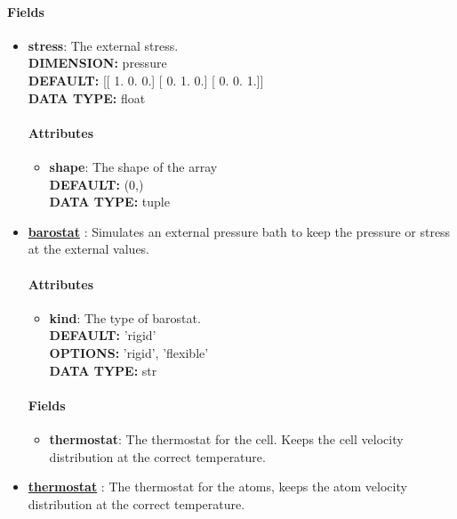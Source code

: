 \paragraph{Fields}
 \begin{itemize}
\item {\bf stress}:
 The external stress.
{\\ \bf DIMENSION: }pressure
{\\ \bf DEFAULT: }
      [[ 1.  0.  0.]
       [ 0.  1.  0.]
       [ 0.  0.  1.]]
{\\ \bf DATA TYPE: }float
\paragraph{Attributes}
 \begin{itemize}
\item {\bf shape}:
 The shape of the array
{\\ \bf DEFAULT: }(0,)
{\\ \bf DATA TYPE: }tuple
\end{itemize}
 
\item {\bf \hyperref[BAROSTAT]{barostat} }:
 Simulates an external pressure bath to keep the pressure or stress at the external values.
\paragraph{Attributes}
 \begin{itemize}
\item {\bf kind}:
 The type of barostat.
{\\ \bf DEFAULT: }'rigid'
{\\ \bf OPTIONS: }'rigid', 'flexible'
{\\ \bf DATA TYPE: }str
\end{itemize}
 
\paragraph{Fields}
 \begin{itemize}
\item {\bf thermostat}:
 The thermostat for the cell. Keeps the cell velocity distribution at the correct temperature.
\end{itemize}
 
\item {\bf \hyperref[THERMOSTATS]{thermostat} }:
 The thermostat for the atoms, keeps the atom velocity distribution at the correct temperature.

\end{itemize}
